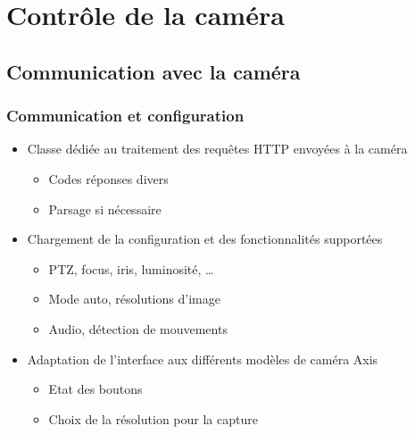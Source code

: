 \section{Contrôle de la caméra}
\subsection{Communication avec la caméra}
  \begin{frame}
   \frametitle{Communication et configuration}

  \begin{minipage}{0.94\textwidth}
  \centering
     \begin{itemize}
    \item Classe dédiée au traitement des requêtes HTTP envoyées à la caméra
    \begin{itemize}
      \item Codes réponses divers
      \item Parsage si nécessaire
      \newline
    \end{itemize}
    \item Chargement de la configuration et des fonctionnalités supportées
    \begin{itemize}
      \item PTZ, focus, iris, luminosité, \ldots
      \item Mode auto, résolutions d'image
      \item Audio, détection de mouvements
      \newline
    \end{itemize}
    \item Adaptation de l'interface aux différents modèles de caméra Axis
    \begin{itemize}
      \item Etat des boutons
      \item Choix de la résolution pour la capture
      \newline
    \end{itemize}
   	\end{itemize}
  \end{minipage}

  \end{frame}
